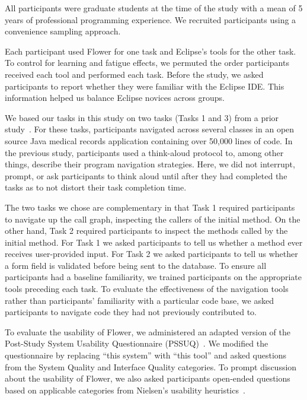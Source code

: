 \documentclass[conference]{IEEEtran}
\begin{document}
All participants were graduate students at the time of the study with a mean of 5 years of professional programming experience. 
We recruited participants using a convenience sampling approach. 

Each participant used Flower for one task and Eclipse's tools for the other task.
To control for learning and fatigue effects, we permuted the order participants received each tool and performed each task. 
Before the study, we asked participants to report whether they were familiar with the Eclipse IDE. This information helped us balance Eclipse novices across groups.

We based our tasks in this study on two tasks (Tasks 1 and 3) from a prior study~\cite{Smith2015}.
For these tasks, participants navigated across several classes in an open source Java medical records application containing over 50,000 lines of code.
In the previous study, participants used a think-aloud protocol to, among other things, describe their program navigation strategies.
Here, we did not interrupt, prompt, or ask participants to think aloud until after they had completed the tasks as to not distort their task completion time.

The two tasks we chose are complementary in that Task 1 required participants to navigate up the call graph, inspecting the callers of the initial method. 
On the other hand, Task 2 required participants to inspect the methods called by the initial method.
For Task 1 we asked participants to tell us whether a method ever receives user-provided input.
For Task 2 we asked participants to tell us whether a form field is validated before being sent to the database.
To ensure all participants had a baseline familiarity, we trained participants on the appropriate tools preceding each task. 
To evaluate the effectiveness of the navigation tools rather than participants' familiarity with a particular code base, we asked participants to navigate code they had not previously contributed to. 


To evaluate the usability of Flower, we administered an adapted version of the Post-Study System Usability Questionnaire (PSSUQ)~\cite{Lewis95ibmcomputer}. We modified the questionnaire by replacing ``this system'' with ``this tool'' and asked questions from the System Quality and Interface Quality categories.
To prompt discussion about the usability of Flower, we also asked participants open-ended questions based on applicable categories from Nielsen's usability heuristics~\cite{Nielsen1992}.
\end{document}
